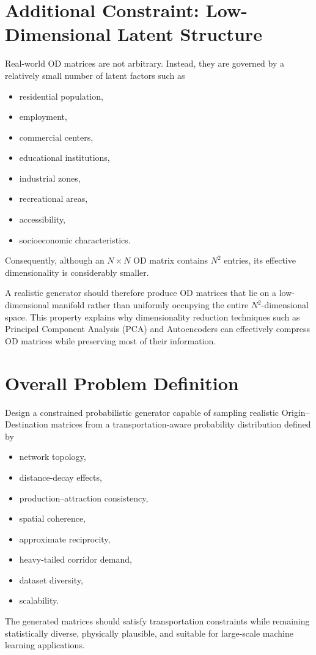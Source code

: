 \documentclass[11pt,a4paper]{article}
\begin{document}
\section{Additional Constraint: Low-Dimensional Latent Structure}

Real-world OD matrices are not arbitrary. Instead, they are governed by a relatively small number of latent factors such as
\begin{itemize}
    \item residential population,
    \item employment,
    \item commercial centers,
    \item educational institutions,
    \item industrial zones,
    \item recreational areas,
    \item accessibility,
    \item socioeconomic characteristics.
\end{itemize}
Consequently, although an $N\times N$ OD matrix contains $N^2$ entries, its effective dimensionality is considerably smaller.

A realistic generator should therefore produce OD matrices that lie on a low-dimensional manifold rather than uniformly occupying the entire $N^2$-dimensional space. This property explains why dimensionality reduction techniques such as Principal Component Analysis (PCA) and Autoencoders can effectively compress OD matrices while preserving most of their information.

\section{Overall Problem Definition}

Design a constrained probabilistic generator capable of sampling realistic Origin--Destination matrices from a transportation-aware probability distribution defined by
\begin{itemize}
    \item network topology,
    \item distance-decay effects,
    \item production--attraction consistency,
    \item spatial coherence,
    \item approximate reciprocity,
    \item heavy-tailed corridor demand,
    \item dataset diversity,
    \item scalability.
\end{itemize}
The generated matrices should satisfy transportation constraints while remaining statistically diverse, physically plausible, and suitable for large-scale machine learning applications.
\end{document}
